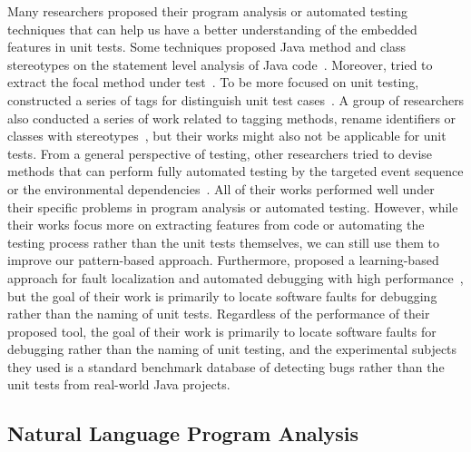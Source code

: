Many researchers proposed their program analysis or automated testing techniques that can help us have a better understanding of the embedded features in unit tests. 
%
Some techniques proposed Java method and class stereotypes on the statement level analysis of Java code~\cite{moreno2012jstereocode,guarnera2018automatically}.
%
Moreover, \citeauthor{ghafari2015automatically} tried to extract the focal method under test~\cite{ghafari2015automatically}.
%
To be more focused on unit testing,~\citeauthor{li2018aiding} constructed a series of tags for distinguish unit test cases~\cite{li2018aiding}.
%
A group of researchers also conducted a series of work related to tagging methods, rename identifiers or classes with stereotypes~\cite{dragan2006reverse,dragan2010automatic,dragan2011emergent,sharif2013identifying,alhindawi2013improving,peruma2018empirical}, but their works might also not be applicable for unit tests.
%
From a general perspective of testing, other researchers tried to devise methods that can perform fully automated testing by the targeted event sequence or the environmental dependencies~\cite{jensen2013automated,arcuri2014automated}.
%
All of their works performed well under their specific problems in program analysis or automated testing. 
However, while their works focus more on extracting features from code or automating the testing process rather than the unit tests themselves, we can still use them to improve our pattern-based approach.
%
Furthermore, \citeauthor{li2019deepfl} proposed a learning-based approach for fault localization and automated debugging with high performance~\cite{li2019deepfl}, but the goal of their work is primarily to locate software faults for debugging rather than the naming of unit tests. 
%
Regardless of the performance of their proposed tool, the goal of their work is primarily to locate software faults for debugging rather than the naming of unit testing, and the experimental subjects they used is a standard benchmark database of detecting bugs rather than the unit tests from real-world Java projects.


\subsection{Natural Language Program Analysis}

